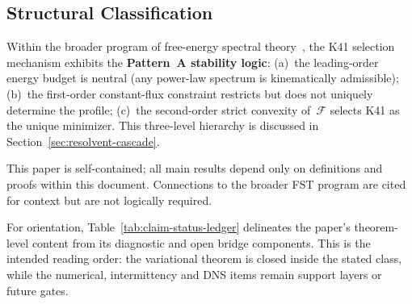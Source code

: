 \documentclass[12pt,a4paper]{article}
\theoremstyle{definition}
\theoremstyle{plain}
\theoremstyle{remark}
\begin{document}
\subsection{Structural Classification}

Within the broader program of free-energy spectral
theory~\cite{FST-Unified2026}, the K41 selection mechanism exhibits the
\textbf{Pattern~A stability logic}: (a)~the leading-order energy budget is
neutral (any power-law spectrum is kinematically admissible); (b)~the
first-order constant-flux constraint restricts but does not uniquely
determine the profile; (c)~the second-order strict convexity
of~$\mathcal{F}$ selects K41 as the unique minimizer.  This three-level
hierarchy is discussed in Section~\ref{sec:resolvent-cascade}.

This paper is self-contained; all main results depend only on definitions
and proofs within this document. Connections to the broader FST program
are cited for context but are not logically required.

For orientation, Table~\ref{tab:claim-status-ledger} delineates the
paper's theorem-level content from its diagnostic and open bridge
components. This is the intended reading order: the variational theorem is
closed inside the stated class, while the numerical, intermittency and DNS
items remain support layers or future gates.
\end{document}
